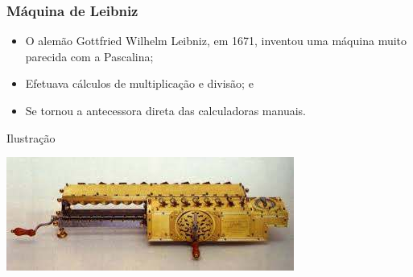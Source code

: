 \documentclass[aspectratio=169]{beamer} %
\begin{document}
\begin{frame}
	\frametitle{Máquina de Leibniz}
	
	\begin{itemize}
		\item O alemão Gottfried Wilhelm Leibniz, em 1671, inventou uma máquina muito parecida com a Pascalina;
		\item Efetuava cálculos de multiplicação e divisão; e
		\item Se tornou a antecessora direta das calculadoras manuais.
	\end{itemize}\vfill
	
	\begin{exampleblock}{Ilustra\c cão}
		\begin{center}
			\includegraphics[scale=0.5]{img/maquina_leibniz}
		\end{center}
	\end{exampleblock}
\end{frame}
\end{document}
